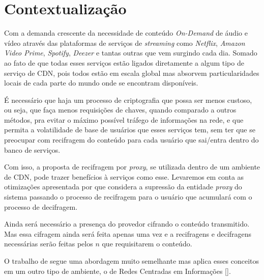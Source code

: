 \section{Contextualização}
\label{proposta:justificativa}
Com a demanda crescente da necessidade de conteúdo \emph{On-Demand} de áudio e vídeo através das plataformas de serviços de \emph{streaming} como \emph{Netflix}, \emph{Amazon Video Prime}, \emph{Spotify}, \emph{Deezer} e tantas outras que vem surgindo cada dia. Somado ao fato de que todas esses serviços estão ligados diretamente a algum tipo de serviço de CDN, pois todos estão em escala global mas absorvem particularidades locais de cada parte do mundo onde se encontram disponíveis. 

É necessário que haja um processo de criptografia que possa ser menos custoso, ou seja, que faça menos requisições de chaves, quando comparado a outros métodos, pra evitar o máximo possível tráfego de informações na rede, e que permita a volatilidade de base de usuários que esses serviços tem, sem ter que se preocupar  com recifragem do conteúdo para cada usuário que sai/entra dentro do banco de serviços.

Com isso, a proposta de recifragem por \emph{proxy}, se utilizada dentro de um ambiente de CDN, pode trazer benefícios à serviços como esse. Levaremos em conta as otimizações apresentada por \cite{mannes2016controle} que considera a supressão da entidade \emph{proxy} do sistema passando o processo de recifragem para o usuário que acumulará com o processo de decifragem.

Ainda será necessário a presença do provedor cifrando o conteúdo transmitido. Mas essa cifragem ainda será feita apenas uma vez e a recifragens e decifragens necessárias serão feitas pelos $n$ que requisitarem o conteúdo.  

O trabalho de \cite{mannes2016controle} segue uma abordagem muito semelhante mas aplica esses conceitos em um outro tipo de ambiente, o de Redes Centradas em Informações [\cite{redesCentradasInfo}].